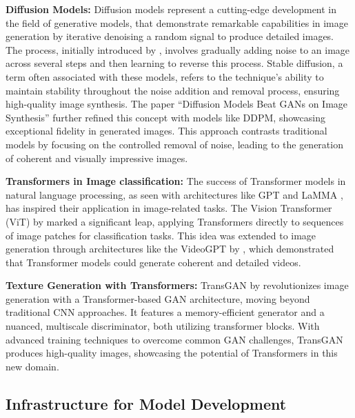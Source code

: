 \textbf{Diffusion Models:} 
Diffusion models represent a cutting-edge development in the field of generative models, that demonstrate remarkable capabilities in image generation by iterative denoising a random signal to produce detailed images. The process, initially introduced by \autocite{sohldickstein2015deep}, involves gradually adding noise to an image across several steps and then learning to reverse this process. Stable diffusion, a term often associated with these models, refers to the technique's ability to maintain stability throughout the noise addition and removal process, ensuring high-quality image synthesis. The paper \enquote{Diffusion Models Beat GANs on Image Synthesis} \autocite{dhariwal2021diffusion} further refined this concept with models like DDPM, showcasing exceptional fidelity in generated images. This approach contrasts traditional models by focusing on the controlled removal of noise, leading to the generation of coherent and visually impressive images.

\textbf{Transformers in Image classification:} 
The success of Transformer models in natural language processing, as seen with architectures like GPT \autocite{GPT2radford2019} and LaMMA \autocite{touvron2023llama}, has inspired their application in image-related tasks. The Vision Transformer (ViT) by \autocite{dosovitskiy2021image} marked a significant leap, applying Transformers directly to sequences of image patches for classification tasks. This idea was extended to image generation through architectures like the VideoGPT by \autocite{yan2021videogpt}, which demonstrated that Transformer models could generate coherent and detailed videos.

\textbf{Texture Generation with Transformers:}
TransGAN by \autocite{jiang2021transgan} revolutionizes image generation with a Transformer-based GAN architecture, moving beyond traditional CNN approaches. It features a memory-efficient generator and a nuanced, multiscale discriminator, both utilizing transformer blocks. With advanced training techniques to overcome common GAN challenges, TransGAN produces high-quality images, showcasing the potential of Transformers in this new domain.

\subsection{Infrastructure for Model Development}

